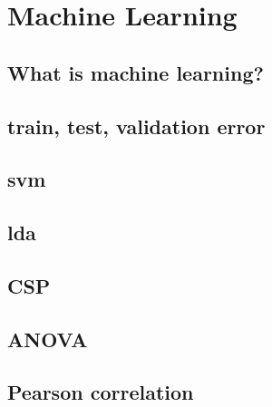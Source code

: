 \chapter{Machine Learning}
{\samenvatting }


\section{What is machine learning?}


\section{train, test, validation error}

\section{svm}

\section{lda}

\section{CSP}

\section{ANOVA}

\section{Pearson correlation}
